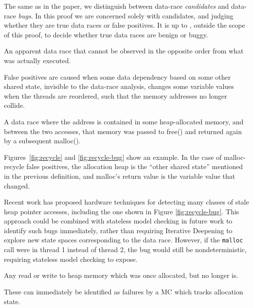The same as in the paper, we distinguish between data-race {\em candidates} and data-race {\em bugs}.
In this proof we are concerned solely with candidates, and judging whether they are true data races or false positives.
It is up to \quicksand, outside the scope of this proof, to decide whether true data races are benign or buggy.

\begin{definition}
	An apparent data race that cannot be observed in the opposite order from what was actually executed.
\end{definition}

False positives are caused when some data dependency based on some other shared state, invisible to the data-race analysis,
changes some variable values when the threads are reordered, such that the memory addresses no longer collide.

\begin{definition}
	A data race where the address is contained in some heap-allocated memory, and between the two accesses, that memory was passed to free() and returned again by a subsequent malloc().
\end{definition}

Figures~\ref{fig:recycle} and \ref{fig:recycle-bug} show an example.
In the case of malloc-recycle false positives, the allocation heap is the ``other shared state'' mentioned in the previous definition, and malloc's return value is the variable value that changed.

Recent work \cite{sparc-ssm} has proposed hardware techniques for detecting many classes of stale heap pointer accesses, including the one shown in Figure \ref{fig:recycle-bug}.
This approach could be combined with stateless model checking in future work to identify such bugs immediately,
rather than requiring Iterative Deepening to explore new state spaces corresponding to the data race.
However, if the {\tt malloc} call were in thread 1 instead of thread 2, the bug would still be nondeterministic, requiring stateless model checking to expose.

\begin{definition}
	Any read or write to heap memory which was once allocated, but no longer is.
\end{definition}

These can immediately be identified as failures by a MC which tracks allocation state.

